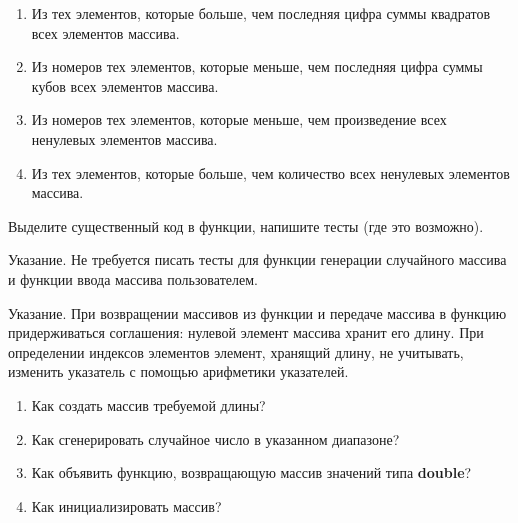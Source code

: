 \begin{enumerate}
	\item
		Из тех элементов, которые больше, чем последняя цифра суммы квадратов всех элементов массива.

	\item
		Из номеров тех элементов, которые меньше, чем последняя цифра суммы кубов всех элементов массива.

	\item
		Из номеров тех элементов, которые меньше, чем произведение всех ненулевых элементов массива.

	\item
		Из тех элементов, которые больше, чем количество всех ненулевых элементов массива.

\end{enumerate}


\labtask

Выделите существенный код в функции, напишите тесты (где это возможно).

Указание. Не требуется писать тесты для функции генерации случайного массива и функции ввода массива пользователем. 

Указание. При возвращении массивов из функции и передаче массива в функцию придерживаться соглашения: нулевой элемент массива хранит его длину.
При определении индексов элементов элемент, хранящий длину, не учитывать, изменить указатель с помощью арифметики указателей.

\labworkquestions

\begin{enumerate}

	\item
		Как создать массив требуемой длины?
	\item
		Как сгенерировать случайное число в указанном диапазоне?
	\item
		Как объявить функцию, возвращающую массив значений типа \textbf{double}?
	\item
		Как инициализировать массив?
\end{enumerate}



